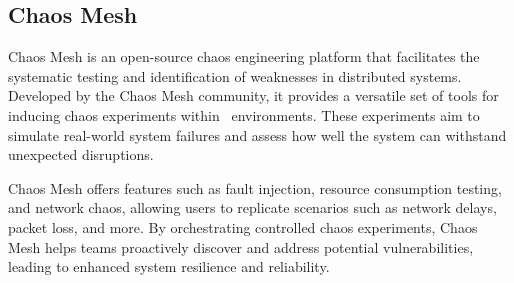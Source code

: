 \subsection{Chaos Mesh}
\label{subsec:chaosmesh}
Chaos Mesh is an open-source chaos engineering platform that facilitates the systematic testing and identification of weaknesses in distributed systems. Developed by the Chaos Mesh community, it provides a versatile set of tools for inducing chaos experiments within~ environments. These experiments aim to simulate real-world system failures and assess how well the system can withstand unexpected disruptions.

Chaos Mesh offers features such as fault injection, resource consumption testing, and network chaos, allowing users to replicate scenarios such as network delays, packet loss, and more. By orchestrating controlled chaos experiments, Chaos Mesh helps teams proactively discover and address potential vulnerabilities, leading to enhanced system resilience and reliability.~\cite{noauthor_chaos_nodate}